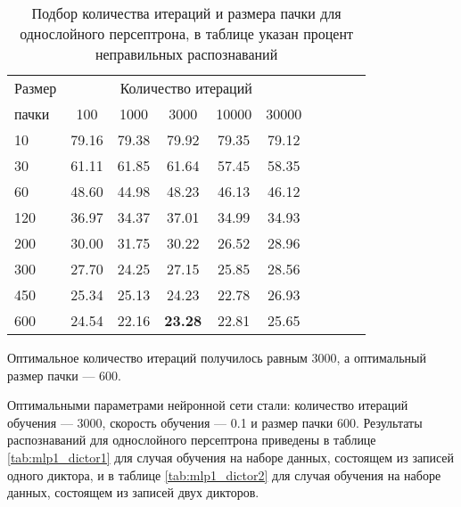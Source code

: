 \begin{table}[h]
	\centering
	\caption{Подбор количества итераций и размера пачки для однослойного персептрона, в таблице указан процент неправильных распознаваний}
	\label{tab:mlp1_bf_iter_batch}
	\begin{tabular}{| l | c | c | c | c | c | c | c | c | c |}
		\hline
		Размер	 & \multicolumn{5}{c|}{Количество итераций} \\
		\hhline{~---------}
		пачки \phantom{0000} & \phantom{000} 100 \phantom{000} & \phantom{000}1000\phantom{000} & \phantom{000}3000\phantom{000} & \phantom{00} 10000 \phantom{00} & \phantom{00} 30000 \phantom{00} \\
		\hline
		10		 & 79.16 & 79.38 & 79.92 & 79.35 & 79.12 \\
		30 		 & 61.11 & 61.85 & 61.64 & 57.45 & 58.35 \\
		60 		 & 48.60 & 44.98 & 48.23 & 46.13 & 46.12 \\
		120 	 & 36.97 & 34.37 & 37.01 & 34.99 & 34.93 \\
		200 	 & 30.00 & 31.75 & 30.22 & 26.52 & 28.96 \\
		300 	 & 27.70 & 24.25 & 27.15 & 25.85 & 28.56 \\
		450 	 & 25.34 & 25.13 & 24.23 & 22.78 & 26.93 \\
		600 	 & 24.54 & 22.16 & \textbf{23.28} & 22.81 & 25.65 \\
		\hline
	\end{tabular}
\end{table}

Оптимальное количество итераций получилось равным 3000, а оптимальный размер пачки --- 600.

Оптимальными параметрами нейронной сети стали: количество итераций обучения --- 3000, скорость обучения --- 0.1 и размер пачки 600.
Результаты распознаваний для однослойного персептрона приведены в таблице \ref{tab:mlp1_dictor1} для случая обучения на наборе данных, состоящем из записей одного диктора, и в таблице \ref{tab:mlp1_dictor2} для случая обучения на наборе данных, состоящем из записей двух дикторов.

